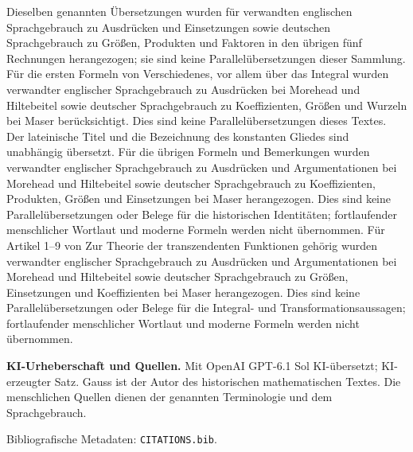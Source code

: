 Dieselben genannten Übersetzungen wurden für verwandten englischen Sprachgebrauch zu Ausdrücken und Einsetzungen sowie deutschen Sprachgebrauch zu Größen, Produkten und Faktoren in den übrigen fünf Rechnungen herangezogen; sie sind keine Parallelübersetzungen dieser Sammlung.
 Für die ersten Formeln von Verschiedenes, vor allem über das Integral wurden verwandter englischer Sprachgebrauch zu Ausdrücken bei Morehead und Hiltebeitel sowie deutscher Sprachgebrauch zu Koeffizienten, Größen und Wurzeln bei Maser berücksichtigt. Dies sind keine Parallelübersetzungen dieses Textes. Der lateinische Titel und die Bezeichnung des konstanten Gliedes sind unabhängig übersetzt.
 Für die übrigen Formeln und Bemerkungen wurden verwandter englischer Sprachgebrauch zu Ausdrücken und Argumentationen bei Morehead und Hiltebeitel sowie deutscher Sprachgebrauch zu Koeffizienten, Produkten, Größen und Einsetzungen bei Maser herangezogen. Dies sind keine Parallelübersetzungen oder Belege für die historischen Identitäten; fortlaufender menschlicher Wortlaut und moderne Formeln werden nicht übernommen.
 Für Artikel 1--9 von Zur Theorie der transzendenten Funktionen gehörig wurden verwandter englischer Sprachgebrauch zu Ausdrücken und Argumentationen bei Morehead und Hiltebeitel sowie deutscher Sprachgebrauch zu Größen, Einsetzungen und Koeffizienten bei Maser herangezogen. Dies sind keine Parallelübersetzungen oder Belege für die Integral- und Transformationsaussagen; fortlaufender menschlicher Wortlaut und moderne Formeln werden nicht übernommen.
\par\medskip\textbf{KI-Urheberschaft und Quellen.} Mit OpenAI GPT-6.1 Sol KI-übersetzt; KI-erzeugter Satz. Gauss ist der Autor des historischen mathematischen Textes. Die menschlichen Quellen dienen der genannten Terminologie und dem Sprachgebrauch.
\par\medskip Bibliografische Metadaten: \texttt{CITATIONS.bib}.
\par\endgroup\clearpage

